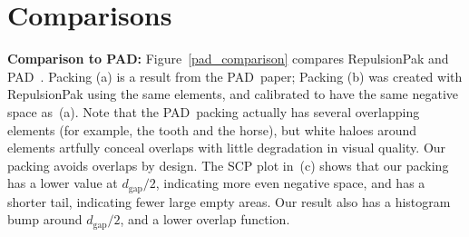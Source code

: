 \section{Comparisons}


\textbf{Comparison to PAD:} 
Figure~\ref{pad_comparison} compares
RepulsionPak and PAD~\cite{Kwan2016}.  Packing (a) is
a result from the PAD\ paper; Packing (b) was created with RepulsionPak using
the same elements, and calibrated to have the same negative space as~(a).
Note that the PAD\ packing actually has several overlapping elements
(for example, the tooth and the horse), but white haloes around
elements artfully conceal overlaps with little degradation in
visual quality.  Our packing avoids overlaps by design.
The SCP plot in~(c) shows that our packing has a lower value at $d_\mathrm{gap}/2$,
indicating more even negative space, and has a shorter tail,
indicating fewer large empty areas.
Our result also has a histogram bump around $d_\mathrm{gap}/2$, and 
a lower overlap function.

